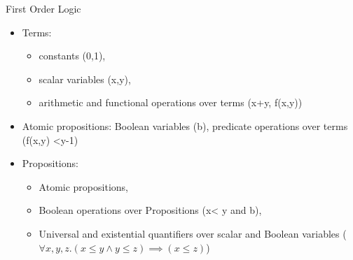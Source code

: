 \begin{frame}{First Order Logic}
  \begin{itemize}
    \item Terms: \begin{itemize} \item constants (0,1), \item scalar variables (x,y), \item arithmetic and functional operations over terms (x+y, f(x,y))
      \end{itemize}
    \item Atomic propositions: Boolean variables (b), predicate operations over terms (f(x,y) <y-1)
    \item Propositions: 
    \begin{itemize}\item Atomic propositions, 
        \item Boolean operations over Propositions (x< y and b),
        \item Universal and existential quantifiers over scalar and Boolean variables ($\forall x,y,z. (x\le y \wedge y\le z) \implies (x \le z)$)
   \end{itemize}
  \end{itemize}  
\end{frame}

